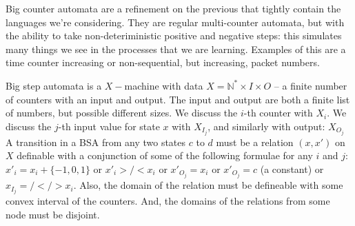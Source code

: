 Big counter automata are a refinement on the previous that tightly contain the languages we're considering.
They are regular multi-counter automata, 
but with the ability to take non-deteriministic positive and negative steps:
this simulates many things we see in the processes that we are learning.
Examples of this are a time counter increasing or non-sequential, but increasing, packet numbers.

\begin{definition}
Big step automata is a $X-$machine
with data $X = \mathbb{N}^* \times I \times O$ 
-- a finite number of counters with an input and output.
The input and output are both a finite list of numbers,
but possible different sizes.
We discuss the $i$-th counter with $X_i$.
We discuss the $j$-th input value for state $x$ with $X_I_j$,
and similarly with output: $X_O_j$
A transition in a BSA from any two states $c$ to $d$
must be a relation $(x, x')$ on $X$ definable with a conjunction of
some of the following formulae for any $i$ and $j$:
$x'_i = x_i + \{-1, 0, 1\}$ or 
$x'_i >/< x_i$ or 
$x'_O_j = x_i$ or
$x'_O_j = c$ (a constant) or
$x_I_j =/</> x_i$.
Also, the domain of the relation must be defineable with
some convex interval of the counters.
And, the domains of the relations from some node must be disjoint.
\end{definition}

